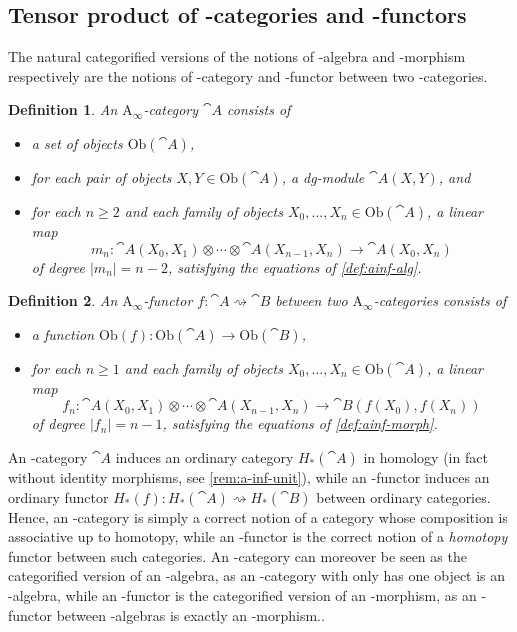 \documentclass[twoside, 12pt]{amsart}
\newtheorem{definition}{Definition}[section]
\theoremstyle{remark}
\begin{document}
\subsection{Tensor product of \Ainf -categories and \Ainf -functors}

The natural categorified versions of the notions of \Ainf -algebra and \Ainf -morphism respectively are the notions of \Ainf -category and \Ainf -functor between two \Ainf -categories.

\begin{definition} 
An $\mathrm{A}_\infty$-category $\cat{A}$ consists of 
\begin{itemize}[leftmargin=*]
  \item a set of objects $\mathrm{Ob}(\cat{A})$,
  \item for each pair of objects $X,Y \in \mathrm{Ob}(\cat{A})$, a dg-module $\cat{A}(X,Y)$, and
  \item for each $n\geq 2$ and each family of objects $X_0,\ldots,X_n \in \mathrm{Ob}(\cat{A})$, a linear map \[m_n : \cat{A}(X_0,X_1) \otimes \cdots \otimes \cat{A}(X_{n-1},X_n) \to \cat{A}(X_0,X_n)\] of degree $|m_n|=n-2$, satisfying the equations of \cref{def:ainf-alg}.
\end{itemize}
\end{definition}

\begin{definition}
An $\mathrm{A}_\infty$-functor $f : \cat{A} \rightsquigarrow \cat{B}$ between two $\mathrm{A}_\infty$-categories consists of 
\begin{itemize}[leftmargin=*]
\item a function $\mathrm{Ob}(f) : \mathrm{Ob}(\cat{A}) \to \mathrm{Ob}(\cat{B})$,
\item for each $n \geq 1$ and each family of objects $X_0, \ldots, X_n \in \mathrm{Ob}(\cat{A})$, a linear map \[f_n : \cat{A}(X_0,X_1) \otimes \cdots \otimes \cat{A}(X_{n-1},X_n) \to \cat{B}(f(X_0),f(X_n))\] of degree $|f_n|=n-1$, satisfying the equations of \cref{def:ainf-morph}.
\end{itemize}
\end{definition}

An \Ainf -category $\cat{A}$ induces an ordinary category $H_*(\cat{A})$ in homology (in fact without identity morphisms, see \cref{rem:a-inf-unit}), while an \Ainf -functor induces an ordinary functor $H_*(f) : H_*(\cat{A}) \rightsquigarrow H_*(\cat{B})$ between ordinary categories. Hence, an \Ainf -category is simply a correct notion of a category whose composition is associative up to homotopy, while an \Ainf -functor is the correct notion of a \emph{homotopy} functor between such categories.
An \Ainf -category can moreover be seen as the categorified version of an \Ainf -algebra, as an \Ainf -category with only has one object is an \Ainf -algebra, while an \Ainf -functor is the categorified version of an \Ainf -morphism, as an \Ainf -functor between \Ainf -algebras is exactly an \Ainf -morphism..
\end{document}
